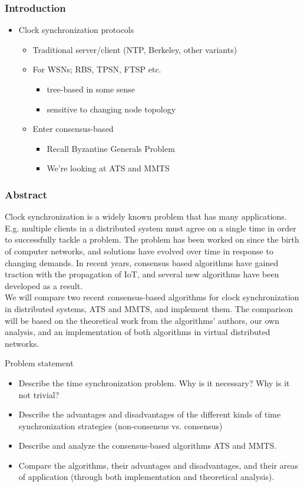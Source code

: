 \documentclass{beamer}
\begin{document}
\begin{frame}
  \frametitle{Introduction}
  \begin{itemize}
  \item<1-> Clock synchronization protocols
    \begin{itemize}
    \item<2-> Traditional server/client (NTP, Berkeley, other variants)
    \item<3-> For WSNs; RBS, TPSN, FTSP etc.      
      \begin{itemize}
      \item<4-> tree-based in some sense
      \item<5-> sensitive to changing node topology
      \end{itemize}      
    \item<6-> Enter consensus-based
      \begin{itemize}
      \item<7-> Recall Byzantine Generals Problem
      \item<8-> We're looking at ATS and MMTS
      \end{itemize}
    \end{itemize}
  \end{itemize}
\end{frame}

\begin{frame}
\frametitle{Abstract}
Clock synchronization is a widely known problem that has many applications. E.g. multiple clients in a distributed system must agree on a single time in order to successfully tackle a problem. The problem has been worked on since the birth of computer networks, and solutions have evolved over time in response to changing demands. In recent years, consensus based algorithms have gained traction with the propagation of IoT, and several new algorithms have been developed as a result.\\
\vspace{1em}
We will compare two recent consensus-based algorithms for clock synchronization in distributed systems, ATS and MMTS, and implement them. The comparison will be based on the theoretical work from the algorithms' authors, our own analysis, and an implementation of both algorithms in virtual distributed networks.
\end{frame}

\begin{frame}{Problem statement}
\begin{itemize}
    \item Describe the time synchronization problem. Why is it necessary? Why is it not trivial? 
    \item Describe the advantages and disadvantages of the different kinds of time synchronization strategies (non-consensus vs. consensus)
    \item Describe and analyze the consensus-based algorithms ATS and MMTS.
    \item Compare the algorithms, their advantages and disadvantages, and their areas of application (through both implementation and theoretical analysis).
\end{itemize}

\end{frame}
 
\end{document}
